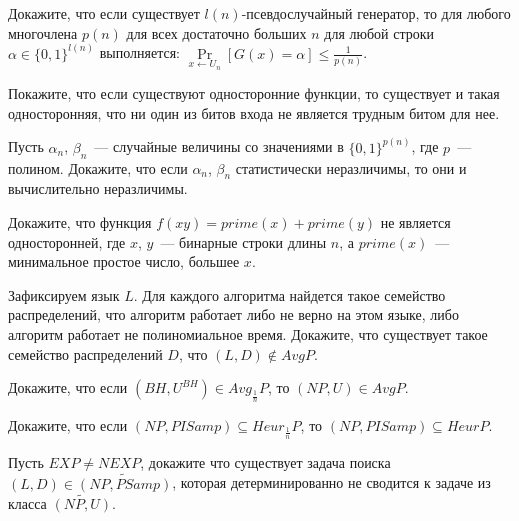 \setcounter{curtask}{23}


\begin{task}
    Докажите, что если существует $l(n)$-псевдослучайный генератор, то для любого
    многочлена $p(n)$ для всех достаточно больших $n$ для любой строки $\alpha \in
    \{0, 1\}^{l(n)}$ выполняется: $\Pr\limits_{x \gets U_n}[G(x) = \alpha] \le
    \frac{1}{p(n)}$.
\end{task}

\begin{task}
    Покажите, что если существуют односторонние функции, то существует и такая
    односторонняя, что ни один из битов входа не является трудным битом для нее.
\end{task}

\begin{task}
    Пусть $\alpha_n$, $\beta_n$~--- случайные величины со значениями в $\{0,
    1\}^{p(n)}$, где $p$~--- полином. Докажите, что если $\alpha_n$, $\beta_n$
    статистически неразличимы, то они и вычислительно неразличимы. 
\end{task}


\breakline

\begin{ptask}{12}
    Докажите, что функция $f(xy) = prime(x) + prime(y)$ не является односторонней,
    где $x$, $y$~--- бинарные строки длины $n$, а $prime(x)$~--- минимальное простое
    число, большее $x$.
\end{ptask}

\begin{ptask}{14}
    Зафиксируем язык $L$. Для каждого алгоритма найдется такое семейство
    распределений, что алгоритм работает либо не верно на этом языке, либо алгоритм
    работает не полиномиальное время. Докажите, что существует такое семейство
    распределений $D$, что $(L, D) \notin AvgP$.
\end{ptask}

\begin{ptask}{20}
    Докажите, что если $(BH, U^{BH}) \in Avg_{\frac{1}{n}}P$, то $(NP, U) \in AvgP$.
\end{ptask}

\begin{ptask}{21}
    Докажите, что если $(NP, PISamp) \subseteq Heur_{\frac{1}{n}}P$, то $(NP, PISamp)
    \subseteq HeurP$.
\end{ptask}

\begin{ptask}{22}
    Пусть $EXP \neq NEXP$, докажите что существует задача поиска $(L, D) \in
    \widetilde{(NP, PSamp)}$,
    которая детерминированно не сводится к задаче из класса $\widetilde{(NP, U)}$.
\end{ptask}
